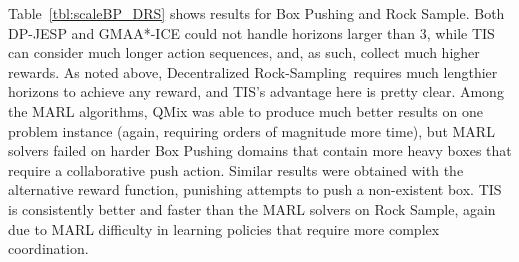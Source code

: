 \documentclass[runningheads]{llncs}
\newcommand{\cbp}[0]{Collaborative Box-Pushing}
\newcommand{\drs}[0]{Decentralized Rock-Sampling}
\begin{document}

Table~\ref{tbl:scaleBP_DRS} 
shows results for Box Pushing and Rock Sample. Both DP-JESP and GMAA*-ICE could not handle horizons larger than 3, while TIS can consider much longer action sequences, and, as such, collect much higher rewards. As noted above, \drs\ requires much lengthier horizons to achieve any reward, and TIS's advantage here is pretty clear.
Among the MARL algorithms, QMix was able to produce much better results on one problem instance (again, requiring orders of magnitude more time), but MARL solvers failed on harder Box Pushing domains that contain more heavy boxes that require a collaborative push action. Similar results were obtained with the alternative reward function, punishing attempts to push a non-existent box.
TIS is consistently better and faster than the MARL solvers on Rock Sample, again due to MARL difficulty in learning policies that require more complex coordination.


\end{document}
